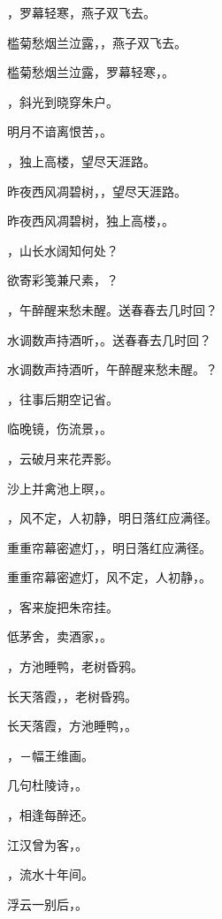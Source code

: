 \documentclass[12pt, a4paper, addpoints, answers]{exam}
\begin{document}
\begin{questions}
\question[3] \fillin，罗幕轻寒，燕子双飞去。

\question[3] 槛菊愁烟兰泣露，\fillin，燕子双飞去。

\question[3] 槛菊愁烟兰泣露，罗幕轻寒，\fillin。

\question[3] \fillin，斜光到晓穿朱户。

\question[3] 明月不谙离恨苦，\fillin。

\question[3] \fillin，独上高楼，望尽天涯路。

\question[3] 昨夜西风凋碧树，\fillin，望尽天涯路。

\question[3] 昨夜西风凋碧树，独上高楼，\fillin。

\question[3] \fillin，山长水阔知何处？

\question[3] 欲寄彩笺兼尺素，\fillin？

\question[3] \fillin，午醉醒来愁未醒。送春春去几时回？

\question[3] 水调数声持酒听，\fillin。送春春去几时回？

\question[3] 水调数声持酒听，午醉醒来愁未醒。\fillin？

\question[3] \fillin，往事后期空记省。

\question[3] 临晚镜，伤流景，\fillin。

\question[3] \fillin，云破月来花弄影。

\question[3] 沙上并禽池上暝，\fillin。

\question[3] \fillin，风不定，人初静，明日落红应满径。

\question[3] 重重帘幕密遮灯，\fillin，明日落红应满径。

\question[3] 重重帘幕密遮灯，风不定，人初静，\fillin。

\question[3] \fillin，客来旋把朱帘挂。

\question[3] 低茅舍，卖酒家，\fillin。

\question[3] \fillin，方池睡鸭，老树昏鸦。

\question[3] 长天落霞，\fillin，老树昏鸦。

\question[3] 长天落霞，方池睡鸭，\fillin。

\question[3] \fillin，－幅王维画。

\question[3] 几句杜陵诗，\fillin。

\question[3] \fillin，相逢每醉还。

\question[3] 江汉曾为客，\fillin。

\question[3] \fillin，流水十年间。

\question[3] 浮云一别后，\fillin。


\end{questions}
\end{document}
